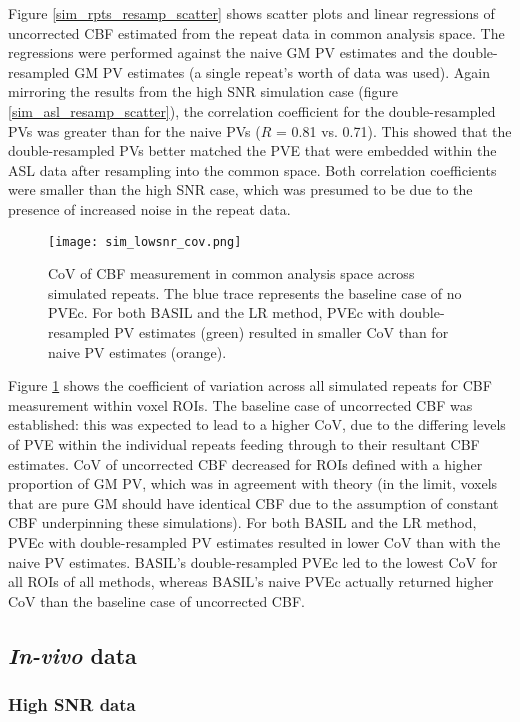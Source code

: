 Figure \ref{sim_rpts_resamp_scatter} shows scatter plots and linear regressions of uncorrected CBF estimated from the repeat data in common analysis space. The regressions were performed against the naive GM PV estimates and the double-resampled GM PV estimates (a single repeat's worth of data was used). Again mirroring the results from the high SNR simulation case (figure \ref{sim_asl_resamp_scatter}), the correlation coefficient for the double-resampled PVs was greater than for the naive PVs ($R$ = 0.81 vs. 0.71). This showed that the double-resampled PVs better matched the PVE that were embedded within the ASL data after resampling into the common space. Both correlation coefficients were smaller than the high SNR case, which was presumed to be due to the presence of increased noise in the repeat data. 


\begin{figure}[H]
\centering
\texttt{[image: sim\_lowsnr\_cov.png]}
\caption{CoV of CBF measurement in common analysis space across simulated repeats. The blue trace represents the baseline case of no PVEc. For both BASIL and the LR method, PVEc with double-resampled PV estimates (green) resulted in smaller CoV than for naive PV estimates (orange).}
\label{sim_lowsnr_cov}
\end{figure}

Figure \ref{sim_lowsnr_cov} shows the coefficient of variation across all simulated repeats for CBF measurement within voxel ROIs. The baseline case of uncorrected CBF was established: this was expected to lead to a higher CoV, due to the differing levels of PVE within the individual repeats feeding through to their resultant CBF estimates. CoV of uncorrected CBF decreased for ROIs defined with a higher proportion of GM PV, which was in agreement with theory (in the limit, voxels that are pure GM should have identical CBF due to the assumption of constant CBF underpinning these simulations). For both BASIL and the LR method, PVEc with double-resampled PV estimates resulted in lower CoV than with the naive PV estimates. BASIL's double-resampled PVEc led to the lowest CoV for all ROIs of all methods, whereas BASIL's naive PVEc actually returned higher CoV than the baseline case of uncorrected CBF. 

\subsection{\textit{In-vivo} data}

\subsubsection{High SNR data}

